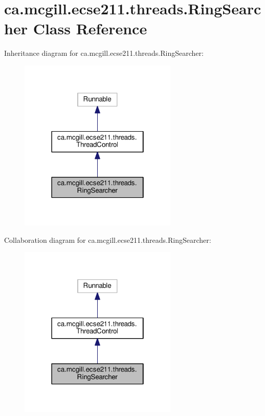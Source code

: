\hypertarget{classca_1_1mcgill_1_1ecse211_1_1threads_1_1_ring_searcher}{}\section{ca.\+mcgill.\+ecse211.\+threads.\+Ring\+Searcher Class Reference}
\label{classca_1_1mcgill_1_1ecse211_1_1threads_1_1_ring_searcher}


Inheritance diagram for ca.\+mcgill.\+ecse211.\+threads.\+Ring\+Searcher\+:\nopagebreak
\begin{figure}[H]
\begin{center}
\leavevmode
\includegraphics[width=214pt]{classca_1_1mcgill_1_1ecse211_1_1threads_1_1_ring_searcher__inherit__graph}
\end{center}
\end{figure}


Collaboration diagram for ca.\+mcgill.\+ecse211.\+threads.\+Ring\+Searcher\+:\nopagebreak
\begin{figure}[H]
\begin{center}
\leavevmode
\includegraphics[width=214pt]{classca_1_1mcgill_1_1ecse211_1_1threads_1_1_ring_searcher__coll__graph}
\end{center}
\end{figure}
